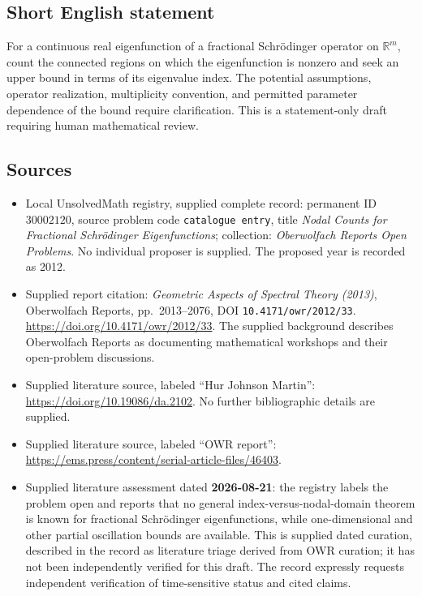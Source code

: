 \documentclass[11pt]{article}
\newcommand{\R}{\mathbb{R}}
\begin{document}
\subsection{Short English statement}
For a continuous real eigenfunction of a fractional Schrödinger operator on \(\R^m\), count the connected regions on which the eigenfunction is nonzero and seek an upper bound in terms of its eigenvalue index. The potential assumptions, operator realization, multiplicity convention, and permitted parameter dependence of the bound require clarification. This is a statement-only draft requiring human mathematical review.
\subsection{Sources}
\begin{itemize}
\item Local UnsolvedMath registry, supplied complete record: permanent ID \(30002120\), source problem code \texttt{catalogue entry}, title \emph{Nodal Counts for Fractional Schrödinger Eigenfunctions}; collection: \emph{Oberwolfach Reports Open Problems}. No individual proposer is supplied. The proposed year is recorded as 2012.
\item Supplied report citation: \emph{Geometric Aspects of Spectral Theory (2013)}, Oberwolfach Reports, pp.\ 2013--2076, DOI \texttt{10.4171/owr/2012/33}. \url{https://doi.org/10.4171/owr/2012/33}. The supplied background describes Oberwolfach Reports as documenting mathematical workshops and their open-problem discussions.
\item Supplied literature source, labeled ``Hur Johnson Martin'': \url{https://doi.org/10.19086/da.2102}. No further bibliographic details are supplied.
\item Supplied literature source, labeled ``OWR report'': \url{https://ems.press/content/serial-article-files/46403}.
\item Supplied literature assessment dated \textbf{2026-08-21}: the registry labels the problem open and reports that no general index-versus-nodal-domain theorem is known for fractional Schrödinger eigenfunctions, while one-dimensional and other partial oscillation bounds are available. This is supplied dated curation, described in the record as literature triage derived from OWR curation; it has not been independently verified for this draft. The record expressly requests independent verification of time-sensitive status and cited claims.
\end{itemize}
\end{document}
